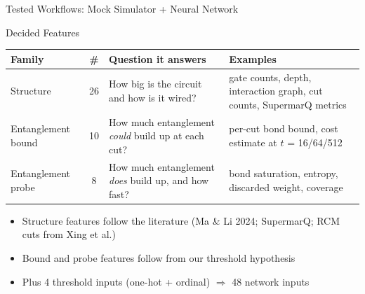 \documentclass[10pt,aspectratio=169]{beamer}
\newcommand{\takeaway}[1]{\par\smallskip{\color{ModelTeal}\bfseries #1}\par\smallskip}
\begin{document}
\begin{frame}{Tested Workflows: Mock Simulator + Neural Network}
\centering
\vspace{.8cm}
\vspace{.8cm}
\takeaway{Challenge score: 94.81\%}
\end{frame}

\begin{frame}{Decided Features}
\small
\renewcommand{\arraystretch}{1.25}
\begin{tabular}{@{}p{2.8cm}c p{5.3cm} p{4.4cm}@{}}\toprule
\textbf{Family} & \textbf{\#} & \textbf{Question it answers} & \textbf{Examples}\\\midrule
Structure & 26 & How big is the circuit and how is it wired? & gate counts, depth, interaction graph, cut counts, SupermarQ metrics\\
Entanglement bound & 10 & How much entanglement \emph{could} build up at each cut? & per-cut bond bound, cost estimate at $t$ = 16/64/512\\
Entanglement probe & 8 & How much entanglement \emph{does} build up, and how fast? & bond saturation, entropy, discarded weight, coverage\\\bottomrule
\end{tabular}
\vspace{2mm}
\begin{itemize}
\item Structure features follow the literature (Ma \& Li 2024; SupermarQ; RCM cuts from Xing et al.)
\item Bound and probe features follow from our threshold hypothesis
\item Plus 4 threshold inputs (one-hot + ordinal) $\Rightarrow$ 48 network inputs
\end{itemize}
\end{frame}
\end{document}
